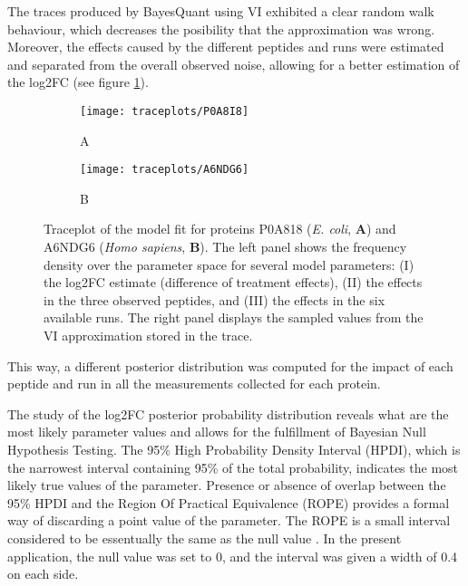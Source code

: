 The traces produced by BayesQuant using \ac{VI} exhibited a clear random walk behaviour, which decreases the posibility that the approximation was wrong. Moreover, the  effects caused by the different peptides and runs were estimated and separated from the overall observed noise, allowing for a better estimation of the \ac{log2FC} (see figure \ref{fig:traceplots}).

\begin{figure}[!h]
\begin{subfigure}{\textwidth}
\centering
\caption*{A}
\texttt{[image: traceplots/P0A8I8]}
\end{subfigure}
\bigskip
\begin{subfigure}{\textwidth}
\centering
\caption*{B}
\texttt{[image: traceplots/A6NDG6]}
\end{subfigure}
\caption{Traceplot of the model fit for proteins P0A818 (\textit{E. coli}, \textbf{A}) and A6NDG6 (\textit{Homo sapiens}, \textbf{B}). The left panel shows the frequency density over the parameter space for several model parameters: (I) the \ac{log2FC} estimate (difference of treatment effects), (II) the effects in the three observed peptides, and (III) the effects in the six available runs. The right panel displays the sampled values from the \ac{VI} approximation stored in the trace.}
\label{fig:traceplots}
\end{figure}

This way, a different posterior distribution was computed for the impact of each peptide and run in all the measurements collected for each protein.



The study of the \ac{log2FC} posterior probability distribution reveals what are the most likely parameter values and allows for the fulfillment of Bayesian Null Hypothesis Testing. The 95\% High Probability Density Interval (\ac{HPDI}), which is the narrowest interval containing 95\% of the total probability, indicates the most likely true values of the parameter. Presence or absence of overlap between the 95\% \ac{HPDI} and the Region Of Practical Equivalence (\ac{ROPE}) provides a formal way of discarding a point value of the parameter. The \ac{ROPE} is a small interval considered to be essentually the same as the null value \cite{Kruschke}. In the present application, the null value was set to 0, and the interval was given a width of 0.4 on each side.

